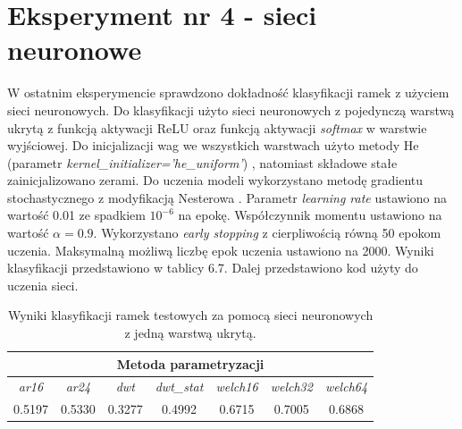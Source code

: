 \documentclass[notitlepage]{report}
\begin{document}
\section{Eksperyment nr 4 - sieci neuronowe}
W ostatnim eksperymencie sprawdzono dokładność klasyfikacji ramek z użyciem sieci neuronowych. Do klasyfikacji użyto sieci neuronowych z pojedynczą warstwą ukrytą z funkcją aktywacji ReLU \cite{glorot} \cite{nair} oraz funkcją aktywacji \textit{softmax} w warstwie wyjściowej. Do inicjalizacji wag we wszystkich warstwach użyto metody He (parametr \textit{kernel\_initializer='he\_uniform'}) \cite{he}, natomiast składowe stałe zainicjalizowano zerami. Do uczenia modeli wykorzystano metodę gradientu stochastycznego z modyfikacją Nesterowa \cite{sutskever}. Parametr \textit{learning rate} ustawiono na wartość 0.01 ze spadkiem $10^{-6}$ na epokę. Współczynnik momentu ustawiono na wartość $\alpha=0.9$. Wykorzystano \textit{early stopping} z cierpliwością równą 50 epokom uczenia. Maksymalną możliwą liczbę epok uczenia ustawiono na 2000. Wyniki klasyfikacji przedstawiono w tablicy 6.7. Dalej przedstawiono kod użyty do uczenia sieci.

\begin{table}[H]
	\centering
	\small
	\setlength\tabcolsep{2pt}
	\begin{tabular}{| c | c | c | c | c | c | c |}
		\hline
		\multicolumn{7}{|c|}{Metoda parametryzacji} \\ \hline
		 \textit{ar16}  & \textit{ar24} & \textit{dwt} & \textit{dwt\_stat} & \textit{welch16} & \textit{welch32} & \textit{welch64} \\ \hline
		 0.5197 & 0.5330 & 0.3277 & 0.4992 & 0.6715 & \color{red} 0.7005 &  0.6868 \\ \hline	
	\end{tabular}
	\caption{Wyniki klasyfikacji ramek testowych za pomocą sieci neuronowych z jedną warstwą ukrytą.}
\end{table} 
\end{document}
